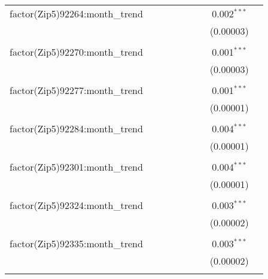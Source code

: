 \begin{table}[H]
{\begin{tabular}{@{\extracolsep{5pt}}lcccccccc}
  factor(Zip5)92264:month\_trend &  &  &  &  &  &  & 0.002$^{***}$ &  \\  

   &  &  &  &  &  &  & (0.00003) &  \\  

   & & & & & & & & \\  

  factor(Zip5)92270:month\_trend &  &  &  &  &  &  & 0.001$^{***}$ &  \\  

   &  &  &  &  &  &  & (0.00003) &  \\  

   & & & & & & & & \\  

  factor(Zip5)92277:month\_trend &  &  &  &  &  &  & 0.001$^{***}$ &  \\  

   &  &  &  &  &  &  & (0.00001) &  \\  

   & & & & & & & & \\  

  factor(Zip5)92284:month\_trend &  &  &  &  &  &  & 0.004$^{***}$ &  \\  

   &  &  &  &  &  &  & (0.00001) &  \\  

   & & & & & & & & \\  

  factor(Zip5)92301:month\_trend &  &  &  &  &  &  & 0.004$^{***}$ &  \\  

   &  &  &  &  &  &  & (0.00001) &  \\  

   & & & & & & & & \\  

  factor(Zip5)92324:month\_trend &  &  &  &  &  &  & 0.003$^{***}$ &  \\  

   &  &  &  &  &  &  & (0.00002) &  \\  

   & & & & & & & & \\  

  factor(Zip5)92335:month\_trend &  &  &  &  &  &  & 0.003$^{***}$ &  \\  

   &  &  &  &  &  &  & (0.00002) &  \\  

   & & & & & & & & \\  


\end{tabular}}
\end{table}
